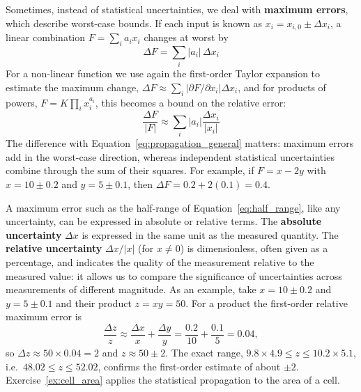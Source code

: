 \documentclass[letterpaper,11pt,leqno]{book}
\begin{document}
Sometimes, instead of statistical uncertainties, we deal with \textbf{maximum errors}, which describe worst-case bounds. If each input is known as $x_i = x_{i,0} \pm \Delta x_i$, a linear combination $F = \sum_i a_ix_i$ changes at worst by
\begin{equation}
\boxed{\Delta F = \sum_i|a_i|\,\Delta x_i}
\label{eq:max_error_linear}
\end{equation}
For a non-linear function we use again the first-order Taylor expansion to estimate the maximum change, $\Delta F \approx \sum_i\left|\partial F/\partial x_i\right|\Delta x_i$, and for products of powers, $F = K\prod_i x_i^{a_i}$, this becomes a bound on the relative error:
\begin{equation}
\boxed{\frac{\Delta F}{|F|} \approx \sum_i|a_i|\frac{\Delta x_i}{|x_i|}}
\label{eq:max_error_powers}
\end{equation}
The difference with Equation~\eqref{eq:propagation_general} matters: maximum errors add in the worst-case direction, whereas independent statistical uncertainties combine through the sum of their squares. For example, if $F = x - 2y$ with $x = 10 \pm 0.2$ and $y = 5 \pm 0.1$, then $\Delta F = 0.2 + 2(0.1) = 0.4$.

A maximum error such as the half-range of Equation~\eqref{eq:half_range}, like any uncertainty, can be expressed in absolute or relative terms. The \textbf{absolute uncertainty} $\Delta x$ is expressed in the same unit as the measured quantity. The \textbf{relative uncertainty} $\Delta x/|x|$ (for $x \neq 0$) is dimensionless, often given as a percentage, and indicates the quality of the measurement relative to the measured value: it allows us to compare the significance of uncertainties across measurements of different magnitude. As an example, take $x = 10 \pm 0.2$ and $y = 5 \pm 0.1$ and their product $z = xy = 50$. For a product the first-order relative maximum error is
\begin{equation*}
\frac{\Delta z}{z} \approx \frac{\Delta x}{x} + \frac{\Delta y}{y} = \frac{0.2}{10} + \frac{0.1}{5} = 0.04,
\end{equation*}
so $\Delta z \approx 50 \times 0.04 = 2$ and $z \approx 50 \pm 2$. The exact range, $9.8 \times 4.9 \le z \le 10.2 \times 5.1$, i.e.\ $48.02 \le z \le 52.02$, confirms the first-order estimate of about $\pm 2$. Exercise~\ref{ex:cell_area} applies the statistical propagation to the area of a cell.

\end{document}
